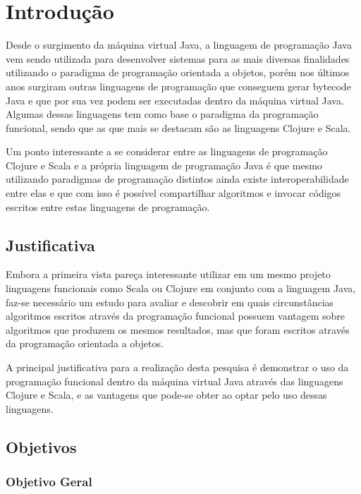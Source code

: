 \chapter{Introdução}

\vspace{-1.9cm}

Desde o surgimento da máquina virtual Java, a linguagem de programação Java vem sendo utilizada para desenvolver sistemas para as mais diversas finalidades utilizando o paradigma de programação orientada a objetos, porém nos últimos anos surgiram outras linguagens de programação que conseguem gerar bytecode Java e que por sua vez podem ser executadas dentro da máquina virtual Java. Algumas dessas linguagens tem como base o paradigma da programação funcional, sendo que as que mais se destacam são as linguagens Clojure e Scala.

Um ponto interessante a se considerar entre as linguagens de programação Clojure e Scala e a própria linguagem de programação Java é que mesmo utilizando paradigmas de programação distintos ainda existe interoperabilidade entre elas e que com isso é possível compartilhar algoritmos e invocar códigos escritos entre estas linguagens de programação.

\section{Justificativa}

  Embora a primeira vista pareça interessante utilizar em um mesmo projeto linguagens funcionais como Scala ou Clojure em conjunto com a linguagem Java, faz-se necessário um estudo para avaliar e descobrir em quais circunstâncias algoritmos escritos através da programação funcional possuem vantagem sobre algoritmos que produzem os mesmos resultados, mas que foram escritos através da programação orientada a objetos.

  A principal justificativa para a realização desta pesquisa é demonstrar o uso da programação funcional dentro da máquina virtual Java através das linguagens Clojure e Scala, e as vantagens que pode-se obter ao optar pelo uso dessas linguagens.

\section{Objetivos}

  \subsection{Objetivo Geral}

